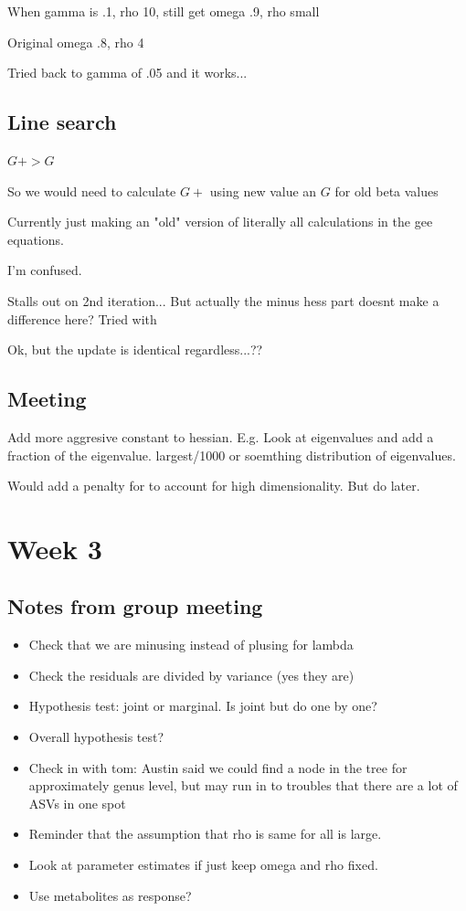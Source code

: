 \documentclass[10pt]{article}
\theoremstyle{definition}
\begin{document}
When gamma is .1, rho 10, still get omega .9, rho small

Original omega .8, rho 4

Tried back to gamma of .05 and it works...


\subsection{Line search}

$G+ > G$

So we would need to calculate $G+$ using new value an $G$ for old beta values

Currently just making an "old" version of literally all calculations in the gee equations.

I'm confused.

Stalls out on 2nd iteration...
But actually the minus hess part doesnt make a difference here?
Tried with

Ok, but the update is identical regardless...??

\subsection{Meeting}

Add more aggresive constant to hessian.
E.g. Look at eigenvalues and add a fraction of the eigenvalue. largest/1000 or soemthing
distribution of eigenvalues.


Would add a penalty for to account for high dimensionality.
But do later.


\section{Week 3}
\subsection{Notes from group meeting}


\begin{itemize}
  \item Check that we are minusing instead of plusing for lambda
  \item Check the residuals are divided by variance (yes they are)
  \item Hypothesis test: joint or marginal. Is joint but do one by one?
  \item Overall hypothesis test?
  \item Check in with tom: Austin said we could find a node in the tree for approximately genus level, but may run in to troubles that there are a lot of ASVs in one spot
  \item Reminder that the assumption that rho is same for all is large.
  \item Look at parameter estimates if just keep omega and rho fixed.
  \item Use metabolites as response?
\end{itemize}
\end{document}
